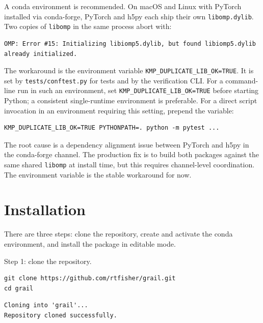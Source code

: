 A conda environment is recommended.
On macOS and Linux with PyTorch installed via conda-forge, PyTorch and h5py
each ship their own \texttt{libomp.dylib}.
Two copies of \texttt{libomp} in the same process abort with:

\begin{lstlisting}[style=grailOutStyle]
OMP: Error #15: Initializing libiomp5.dylib, but found libiomp5.dylib
already initialized.
\end{lstlisting}

The workaround is the environment variable \texttt{KMP\_DUPLICATE\_LIB\_OK=TRUE}.
It is set by \texttt{tests/conftest.py} for tests and by the verification CLI. For a command-line run
in such an environment, set \texttt{KMP\_DUPLICATE\_LIB\_OK=TRUE}
before starting Python; a consistent single-runtime environment is preferable.
For a direct script invocation in an environment requiring this setting,
prepend the variable:

\begin{lstlisting}[style=grailOutStyle]
KMP_DUPLICATE_LIB_OK=TRUE PYTHONPATH=. python -m pytest ...
\end{lstlisting}

The root cause is a dependency alignment issue between PyTorch and h5py in
the conda-forge channel.
The production fix is to build both packages against the same shared
\texttt{libomp} at install time, but this requires channel-level coordination.
The environment variable is the stable workaround for now.

\section{Installation}
\label{sec:install}

There are three steps: clone the repository, create and activate the conda
environment, and install the package in editable mode.

\medskip
\noindent Step 1: clone the repository.

\begin{lstlisting}[style=grailInStyle]
git clone https://github.com/rtfisher/grail.git
cd grail
\end{lstlisting}

\begin{lstlisting}[style=grailOutStyle]
Cloning into 'grail'...
Repository cloned successfully.
\end{lstlisting}

